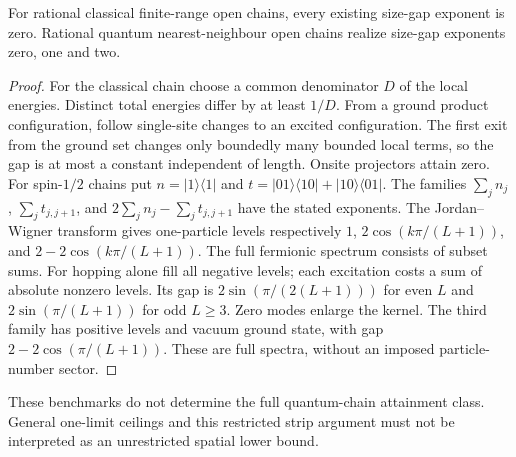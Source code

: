 \begin{proposition}
For rational classical finite-range open chains, every existing
size-gap exponent is zero. Rational quantum nearest-neighbour open
chains realize size-gap exponents zero, one and two.
\end{proposition}
\begin{proof}
For the classical chain choose a common denominator $D$ of the local
energies. Distinct total energies differ by at least $1/D$. From a
ground product configuration, follow single-site changes to an
excited configuration. The first exit from the ground set changes
only boundedly many bounded local terms, so the gap is at most a
constant independent of length. Onsite projectors attain zero.
For spin-$1/2$ chains put $n=|1\rangle\langle1|$ and
$t=|01\rangle\langle10|+|10\rangle\langle01|$.
The families $\sum_jn_j$, $\sum_jt_{j,j+1}$, and
$2\sum_jn_j-\sum_jt_{j,j+1}$ have the stated exponents.
The Jordan--Wigner transform gives one-particle levels respectively
$1$, $2\cos(k\pi/(L+1))$, and
$2-2\cos(k\pi/(L+1))$. The full fermionic spectrum consists of
subset sums. For hopping alone fill all negative levels; each
excitation costs a sum of absolute nonzero levels. Its gap is
$2\sin(\pi/(2(L+1)))$ for even $L$ and
$2\sin(\pi/(L+1))$ for odd $L\geq3$. Zero modes enlarge the
kernel. The third family has positive levels and vacuum ground
state, with gap $2-2\cos(\pi/(L+1))$. These are full spectra,
without an imposed particle-number sector.
\end{proof}
These benchmarks do not determine the full quantum-chain attainment
class. General one-limit ceilings and this restricted strip argument
must not be interpreted as an unrestricted spatial lower bound.
